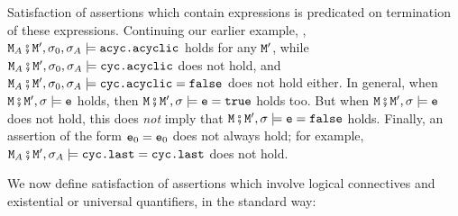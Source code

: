 Satisfaction of assertions which contain expressions is predicated on termination of these expressions.
Continuing our earlier example, ,  
$\M_A\mkpair \M', \sigma_0,\sigma_A \models \prg{acyc.acyclic}$ holds for any $\M'$, while $\M_A\mkpair \M', \sigma_0,\sigma_A \models \prg{cyc.acyclic}$
does not hold, and $\M_A\mkpair \M', \sigma_0,\sigma_A \models \prg{cyc.acyclic}=\prg{false}$ does not hold either.
In general, when $\M\mkpair \M', \sigma  \models \prg{e}$ holds,  then $\M\mkpair \M', \sigma  \models \prg{e}=\prg{true}$ holds too.
But when $\M\mkpair \M', \sigma  \models \prg{e}$ does not hold, this does \emph{not} imply that $\M\mkpair \M', \sigma  \models \prg{e}=\prg{false}$ holds.
Finally, an assertion of the form $\e_0=\e_0$ does not always hold; for example,   $\M_A\mkpair \M', \sigma_A \models \prg{cyc.last}=\prg{cyc.last}$ does not hold.


We now define satisfaction of assertions which involve logical connectives and existential or universal quantifiers, in the standard way:

